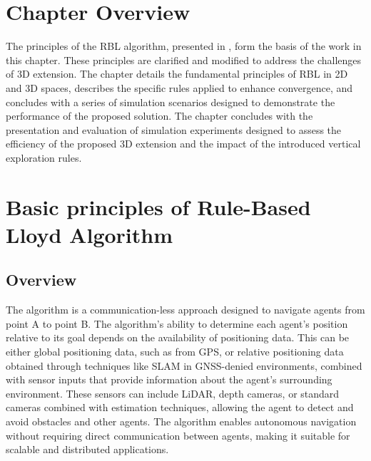 
\section{Chapter Overview}
    The principles of the \ac{RBL} algorithm, presented in \cite{rbl_paper}, form the basis of the work in this chapter. 
    These principles are clarified and modified to address the challenges of 3D extension.  
    The chapter details the fundamental principles of RBL in 2D and 3D spaces, describes the specific rules applied to enhance convergence, and concludes with a series of simulation scenarios designed to demonstrate the performance of the proposed solution.
    The chapter concludes with the presentation and evaluation of simulation experiments designed to assess the efficiency of the proposed 3D extension and the impact of the introduced vertical exploration rules.

\section{Basic principles of Rule-Based Lloyd Algorithm}

    \subsection{Overview}        
        The algorithm is a communication-less approach designed to navigate agents from point A to point B. 
        The algorithm's ability to determine each agent's position relative to its goal depends on the availability of positioning data. 
        This can be either global positioning data, such as from GPS, or relative positioning data obtained through techniques like SLAM in GNSS-denied environments, combined with sensor inputs that provide information about the agent's surrounding environment.
        These sensors can include LiDAR, depth cameras, or standard cameras combined with estimation techniques, allowing the agent to detect and avoid obstacles and other agents. 
        The algorithm enables autonomous navigation without requiring direct communication between agents, making it suitable for scalable and distributed applications.


